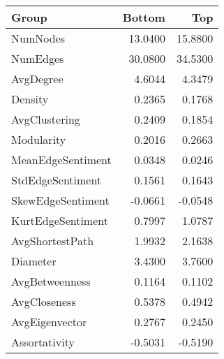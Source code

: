 \begin{tabular}{lrr}
\toprule
Group & Bottom & Top \\
\midrule
NumNodes & 13.0400 & 15.8800 \\
NumEdges & 30.0800 & 34.5300 \\
AvgDegree & 4.6044 & 4.3479 \\
Density & 0.2365 & 0.1768 \\
AvgClustering & 0.2409 & 0.1854 \\
Modularity & 0.2016 & 0.2663 \\
MeanEdgeSentiment & 0.0348 & 0.0246 \\
StdEdgeSentiment & 0.1561 & 0.1643 \\
SkewEdgeSentiment & -0.0661 & -0.0548 \\
KurtEdgeSentiment & 0.7997 & 1.0787 \\
AvgShortestPath & 1.9932 & 2.1638 \\
Diameter & 3.4300 & 3.7600 \\
AvgBetweenness & 0.1164 & 0.1102 \\
AvgCloseness & 0.5378 & 0.4942 \\
AvgEigenvector & 0.2767 & 0.2450 \\
Assortativity & -0.5031 & -0.5190 \\
\bottomrule
\end{tabular}
